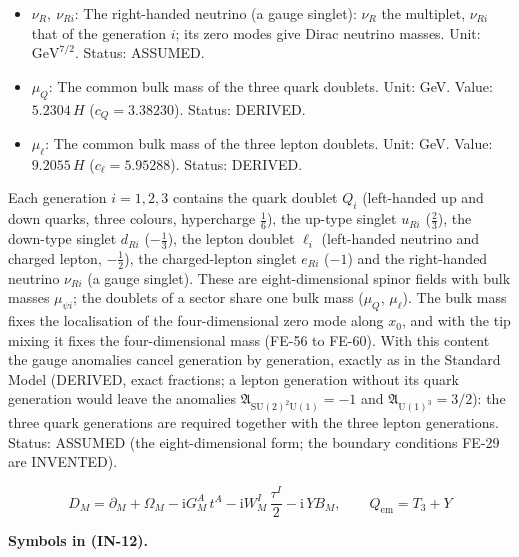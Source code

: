 \documentclass[
  10pt,
]{article}
\begin{document}
\begin{itemize}
  \(e_R,\ e_{Ri}\): The right-handed charged-lepton singlet: \(e_R\) the
  multiplet, \(e_{Ri}\) that of the generation \(i\) (\(e_R\),
  \(\mu_R\), \(\tau_R\)). Unit: \(\mathrm{GeV}^{7/2}\). Status: ASSUMED.
\item
  \(\nu_R,\ \nu_{Ri}\): The right-handed neutrino (a gauge singlet):
  \(\nu_R\) the multiplet, \(\nu_{Ri}\) that of the generation \(i\);
  its zero modes give Dirac neutrino masses. Unit:
  \(\mathrm{GeV}^{7/2}\). Status: ASSUMED.
\item
  \(\mu_Q\): The common bulk mass of the three quark doublets. Unit:
  GeV. Value: \(5.2304\,H\) (\(c_Q = 3.38230\)). Status: DERIVED.
\item
  \(\mu_\ell\): The common bulk mass of the three lepton doublets. Unit:
  GeV. Value: \(9.2055\,H\) (\(c_\ell = 5.95288\)). Status: DERIVED.
\end{itemize}

Each generation \(i = 1, 2, 3\) contains the quark doublet \(Q_i\)
(left-handed up and down quarks, three colours, hypercharge
\(\frac16\)), the up-type singlet \(u_{Ri}\) (\(\frac23\)), the
down-type singlet \(d_{Ri}\) (\(-\frac13\)), the lepton doublet
\(\ell_i\) (left-handed neutrino and charged lepton, \(-\frac12\)), the
charged-lepton singlet \(e_{Ri}\) (\(-1\)) and the right-handed neutrino
\(\nu_{Ri}\) (a gauge singlet). These are eight-dimensional spinor
fields with bulk masses \(\mu_{\psi i}\); the doublets of a sector share
one bulk mass (\(\mu_Q\), \(\mu_\ell\)). The bulk mass fixes the
localisation of the four-dimensional zero mode along \(x_0\), and with
the tip mixing it fixes the four-dimensional mass (FE-56 to FE-60). With
this content the gauge anomalies cancel generation by generation,
exactly as in the Standard Model (DERIVED, exact fractions; a lepton
generation without its quark generation would leave the anomalies
\(\mathfrak{A}_{\mathrm{SU(2)^2U(1)}} = -1\) and
\(\mathfrak{A}_{\mathrm{U(1)^3}} = 3/2\)): the three quark generations
are required together with the three lepton generations. Status: ASSUMED
(the eight-dimensional form; the boundary conditions FE-29 are
INVENTED).

\[
D_M = \partial_M + \Omega_M - \mathrm{i}G^A_M\,t^A - \mathrm{i}W^I_M\,\frac{\tau^I}{2} - \mathrm{i}\,Y
 B_M,\qquad
Q_{\mathrm{em}} = T_3 + Y \tag{IN-12}
\]

\textbf{Symbols in (IN-12).}
\end{document}
